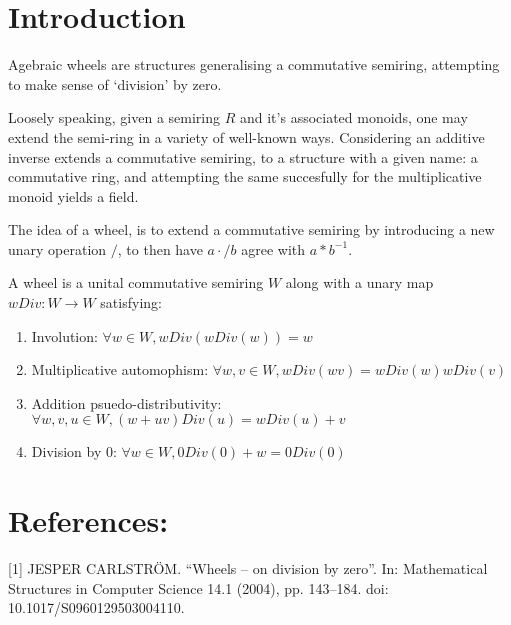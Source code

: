 %
\chapter{Introduction}
Agebraic wheels are structures generalising a commutative semiring, attempting to make sense of  `division' by zero. \par
Loosely speaking, given a semiring $R$ and it's associated monoids, one may extend the semi-ring in a variety of well-known ways. Considering an additive inverse extends a commutative semiring, to a structure with a given name: a commutative ring, and attempting the same succesfully for the multiplicative monoid yields a field. \par
The idea of a wheel, is to extend a commutative semiring by introducing a new unary operation $/$, to then have $a \cdot / b$ agree with $a*b^{-1}$.
\begin{definition}
  \label{def:Wheel}
  \leanok
   A wheel is a unital commutative semiring $W$ along with a unary map $wDiv: W \rightarrow W$ satisfying:
  \begin{enumerate}
  \item Involution: $\forall w \in W, wDiv(wDiv(w)) = w$ 
  \item Multiplicative automophism: $\forall w, v \in W, wDiv(wv) = wDiv(w)wDiv(v)$
  \item Addition psuedo-distributivity: $\forall w, v, u \in W, (w + uv)Div(u) = wDiv(u)+ v$
  \item Division by 0: $\forall w \in W, 0Div(0) + w = 0Div(0)$
  \end{enumerate}
\end{definition}
\chapter{References:}
[1] JESPER CARLSTRÖM. “Wheels – on division by zero”. In: Mathematical Structures in Computer Science 14.1 (2004), pp. 143–184. doi: 10.1017/S0960129503004110.
